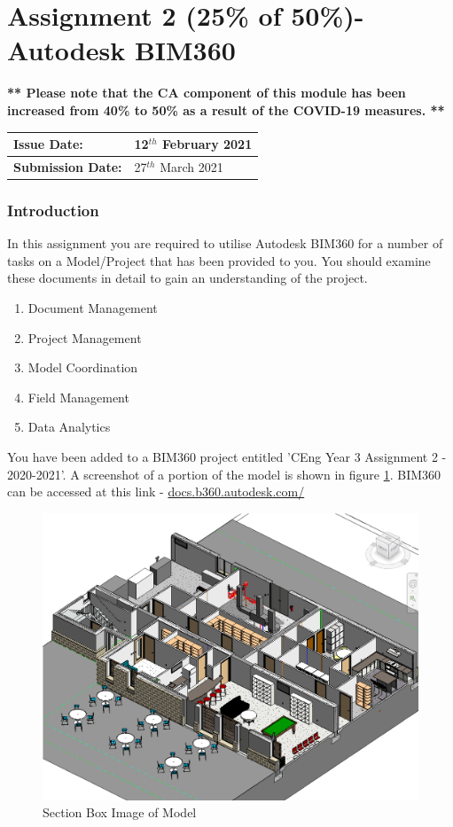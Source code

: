 
	

\part*{Assignment 2 (25\% of 50\%)- Autodesk BIM360}

\textbf{** Please note that the CA component of this module has been increased from 40\% to 50\% as a result of the  COVID-19 measures. **}\\ 



\begin{tabularx}{\textwidth}{ |X|X| }
	\hline
	\textbf{Issue Date:} & 12$^{th}$ February 2021\\
	\hline 
	\textbf{Submission Date:}  & 27$^{th}$ March 2021\\
	\hline
\end{tabularx}

\section*{Introduction}

In this assignment you are required to utilise Autodesk BIM360 for a number of tasks on a Model/Project that has been provided to you.  You should examine these documents in detail to gain an understanding of the project.\\

\begin{enumerate}
	\item Document Management 
	\item Project Management
	\item Model Coordination
	\item Field Management
	\item Data Analytics
\end{enumerate}

You have been added to a BIM360 project entitled 'CEng Year 3 Assignment 2 - 2020-2021'.  A screenshot of a portion of the model is shown in figure \ref{fig:thumbnail}.  BIM360 can be accessed at this link - \href{https://docs.b360.autodesk.com/}{docs.b360.autodesk.com/}

\begin{figure}
	\centering
	\includegraphics[width=0.7\linewidth]{RevitAssets/Thumbnail}
	\caption[Section Box Image of Model]{Section Box Image of Model}
	\label{fig:thumbnail}
\end{figure}





